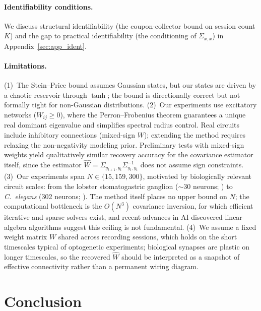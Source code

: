 \documentclass{article}
\begin{document}
\paragraph{Identifiability conditions.}
We discuss structural identifiability (the coupon-collector bound on session count $K$) and the gap to practical identifiability (the conditioning of $\Sigma_{x,x}$) in Appendix~\ref{sec:app_ident}.

\paragraph{Limitations.}
(1)~The Stein--Price bound assumes Gaussian states, but our states are driven by a chaotic reservoir through $\tanh$; the bound is directionally correct but not formally tight for non-Gaussian distributions.
(2)~Our experiments use excitatory networks ($W_{ij} \geq 0$), where the Perron--Frobenius theorem \citep{horn1985matrix} guarantees a unique real dominant eigenvalue and simplifies spectral radius control.
Real circuits include inhibitory connections (mixed-sign $W$); extending the method requires relaxing the non-negativity modeling prior.
Preliminary tests with mixed-sign weights yield qualitatively similar recovery accuracy for the covariance estimator itself, since the estimator $\hat{W} = \Sigma_{y_{t+1},y_t}\Sigma_{y_t,y_t}^{-1}$ does not assume sign constraints.
(3)~Our experiments span $N \in \{15, 159, 300\}$, motivated by biologically relevant circuit scales: from the lobster stomatogastric ganglion (${\sim}30$ neurons; \citep{marder2007understanding}) to \textit{C.~elegans} (302 neurons; \citep{white1986structure}). The method itself places no upper bound on $N$; the computational bottleneck is the $O(N^3)$ covariance inversion, for which efficient iterative and sparse solvers exist, and recent advances in AI-discovered linear-algebra algorithms \citep{fawzi2022discovering} suggest this ceiling is not fundamental.
(4)~We assume a fixed weight matrix $W$ shared across recording sessions, which holds on the short timescales typical of optogenetic experiments; biological synapses are plastic on longer timescales, so the recovered $\hat{W}$ should be interpreted as a snapshot of effective connectivity rather than a permanent wiring diagram.

\section{Conclusion}
\label{sec:conclusion}
\end{document}
